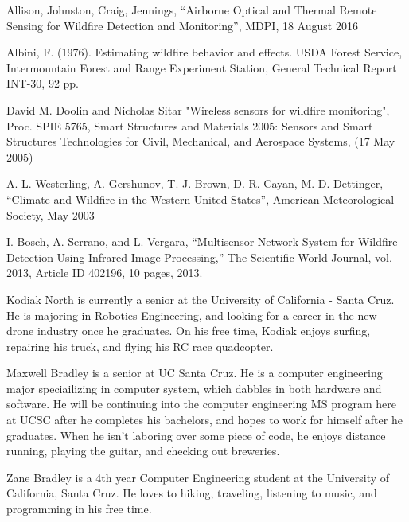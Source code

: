 \documentclass[12pt,journal,compsoc]{IEEEtran}
\begin{document}
\begin{thebibliography}{2}
Allison, Johnston, Craig, Jennings, “Airborne Optical and Thermal Remote Sensing for Wildfire Detection and Monitoring”, MDPI, 18 August 2016

Albini, F. (1976). Estimating wildfire behavior and effects. USDA Forest Service, Intermountain Forest and Range Experiment Station, General Technical Report INT-30, 92 pp.

David M. Doolin and Nicholas Sitar "Wireless sensors for wildfire monitoring", Proc. SPIE 5765, Smart Structures and Materials 2005: Sensors and Smart Structures Technologies for Civil, Mechanical, and Aerospace Systems, (17 May 2005)

A. L. Westerling, A. Gershunov, T. J. Brown, D. R. Cayan, M. D. Dettinger, “Climate and Wildfire in the Western United States”, American Meteorological Society, May 2003

I. Bosch, A. Serrano, and L. Vergara, “Multisensor Network System for Wildfire Detection Using Infrared Image Processing,” The Scientific World Journal, vol. 2013, Article ID 402196, 10 pages, 2013.


\end{thebibliography}

\begin{IEEEbiographynophoto}{Kodiak North}
is currently a senior at the University of California - Santa Cruz. He is majoring in Robotics Engineering, and looking for a career in the new drone industry once he graduates. On his free time, Kodiak enjoys surfing, repairing his truck, and flying his RC race quadcopter.
\end{IEEEbiographynophoto}

\begin{IEEEbiographynophoto}{Maxwell Bradley}
is a senior at UC Santa Cruz. He is a computer engineering major speciailizing in computer system, which dabbles in both hardware and software. He will be continuing into the computer engineering MS program here at UCSC after he completes his bachelors, and hopes to work for himself after he graduates. When he isn't laboring over some piece of code, he enjoys distance running, playing the guitar, and checking out breweries.
\end{IEEEbiographynophoto}

\begin{IEEEbiographynophoto}{Zane Bradley}
is a 4th year Computer Engineering student at the University of California, Santa Cruz. He loves to hiking, traveling, listening to music, and programming in his free time.
\end{IEEEbiographynophoto}
\end{document}
